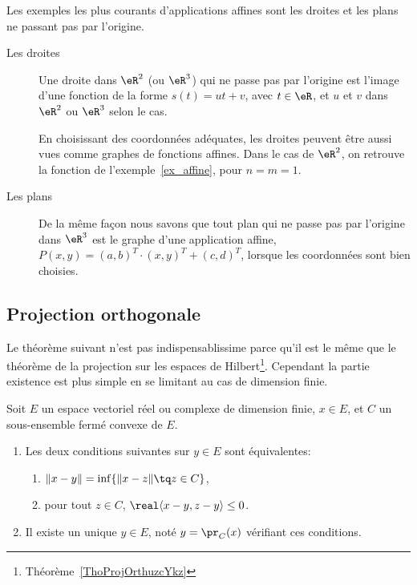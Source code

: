 \begin{example}
	Les exemples les plus courants d'applications affines sont les droites et les plans ne passant pas par l'origine.
	\begin{description}
		\item[Les droites] Une droite dans \( \eR^2\) (ou \( \eR^3\)) qui ne passe pas par l'origine est l'image d'une fonction de la forme \( s(t) =u t +v\), avec \( t \in \eR\), et \( u\) et \( v\) dans \( \eR^2\) ou \( \eR^3\) selon le cas.

		      En choisissant des coordonnées adéquates, les droites peuvent être aussi vues comme graphes de fonctions affines. Dans le cas de \( \eR^2\), on retrouve la fonction de l'exemple~\ref{ex_affine}, pour \( n = m = 1 \).

		\item[Les plans]
		      De la même façon nous savons que tout plan qui ne passe pas par l'origine dans \( \eR^3\) est le graphe d'une application affine, \( P(x,y)= (a,b)^T\cdot(x,y)^T+(c,d)^T\), lorsque les coordonnées sont bien choisies.
	\end{description}
\end{example}


\subsection{Projection orthogonale}

Le théorème suivant n'est pas indispensablissime parce qu'il est le même que le théorème de la projection sur les espaces de Hilbert\footnote{Théorème~\ref{ThoProjOrthuzcYkz}}. Cependant la partie existence est plus simple en se limitant au cas de dimension finie.
\begin{theoremDef}  \label{ThoWKwosrH}
	Soit \( E\) un espace vectoriel réel ou complexe de dimension finie, \( x\in E\), et \( C\) un sous-ensemble fermé convexe de \(E\).
	\begin{enumerate}
		\item
		      Les deux conditions suivantes sur \( y\in E\) sont équivalentes:
		      \begin{enumerate}
			      \item   \label{zzETsfYCSItemi}
			            \( \| x-y \|=\inf\{ \| x-z \|\tq z\in C \}\),
			      \item\label{zzETsfYCSItemii}
			            pour tout \( z\in C\), \( \real\langle x-y, z-y\rangle \leq 0\).
		      \end{enumerate}
		\item
		      Il existe un unique \( y\in E\), noté \( y=\pr_C(x)\) vérifiant ces conditions.
	\end{enumerate}
\end{theoremDef}

